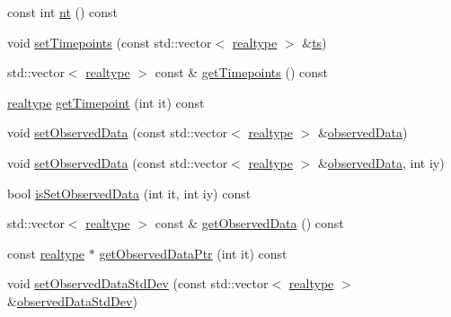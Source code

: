 \begin{DoxyCompactItemize}
const int \mbox{\hyperlink{classamici_1_1_exp_data_a7a59559fad838f7351cde47984c00ba0}{nt}} () const
\item 
void \mbox{\hyperlink{classamici_1_1_exp_data_a058fb6c96339b5116b1af937bc77c2e4}{set\+Timepoints}} (const std\+::vector$<$ \mbox{\hyperlink{namespaceamici_a1bdce28051d6a53868f7ccbf5f2c14a3}{realtype}} $>$ \&\mbox{\hyperlink{classamici_1_1_exp_data_aa7014a80e7b102f85a10e3b9a480e8e5}{ts}})
\item 
std\+::vector$<$ \mbox{\hyperlink{namespaceamici_a1bdce28051d6a53868f7ccbf5f2c14a3}{realtype}} $>$ const  \& \mbox{\hyperlink{classamici_1_1_exp_data_a50ea5198d117f8f4ad1e34bb279975c8}{get\+Timepoints}} () const
\item 
\mbox{\hyperlink{namespaceamici_a1bdce28051d6a53868f7ccbf5f2c14a3}{realtype}} \mbox{\hyperlink{classamici_1_1_exp_data_abee92d90cb7fe75fa39fb98c2ab0fd0a}{get\+Timepoint}} (int it) const
\item 
void \mbox{\hyperlink{classamici_1_1_exp_data_a85ca23791c279fe94e5d9f8e528ca63e}{set\+Observed\+Data}} (const std\+::vector$<$ \mbox{\hyperlink{namespaceamici_a1bdce28051d6a53868f7ccbf5f2c14a3}{realtype}} $>$ \&\mbox{\hyperlink{classamici_1_1_exp_data_a6acedf749a3c5e4c4dcbc822f58a565d}{observed\+Data}})
\item 
void \mbox{\hyperlink{classamici_1_1_exp_data_a814827d61da6c675276758c856faf794}{set\+Observed\+Data}} (const std\+::vector$<$ \mbox{\hyperlink{namespaceamici_a1bdce28051d6a53868f7ccbf5f2c14a3}{realtype}} $>$ \&\mbox{\hyperlink{classamici_1_1_exp_data_a6acedf749a3c5e4c4dcbc822f58a565d}{observed\+Data}}, int iy)
\item 
bool \mbox{\hyperlink{classamici_1_1_exp_data_aedcda756b6356d6e147f2f4eb7658500}{is\+Set\+Observed\+Data}} (int it, int iy) const
\item 
std\+::vector$<$ \mbox{\hyperlink{namespaceamici_a1bdce28051d6a53868f7ccbf5f2c14a3}{realtype}} $>$ const  \& \mbox{\hyperlink{classamici_1_1_exp_data_a509b3b8f38e8529dd59c1415dc6b839c}{get\+Observed\+Data}} () const
\item 
const \mbox{\hyperlink{namespaceamici_a1bdce28051d6a53868f7ccbf5f2c14a3}{realtype}} $\ast$ \mbox{\hyperlink{classamici_1_1_exp_data_a8839910b831f8c55976d880df081fb3e}{get\+Observed\+Data\+Ptr}} (int it) const
\item 
void \mbox{\hyperlink{classamici_1_1_exp_data_a5d84a162eb705e032820acd004603f29}{set\+Observed\+Data\+Std\+Dev}} (const std\+::vector$<$ \mbox{\hyperlink{namespaceamici_a1bdce28051d6a53868f7ccbf5f2c14a3}{realtype}} $>$ \&\mbox{\hyperlink{classamici_1_1_exp_data_aa097568cebb4be48c4c1dfaab0c2a159}{observed\+Data\+Std\+Dev}})

\end{DoxyCompactItemize}
